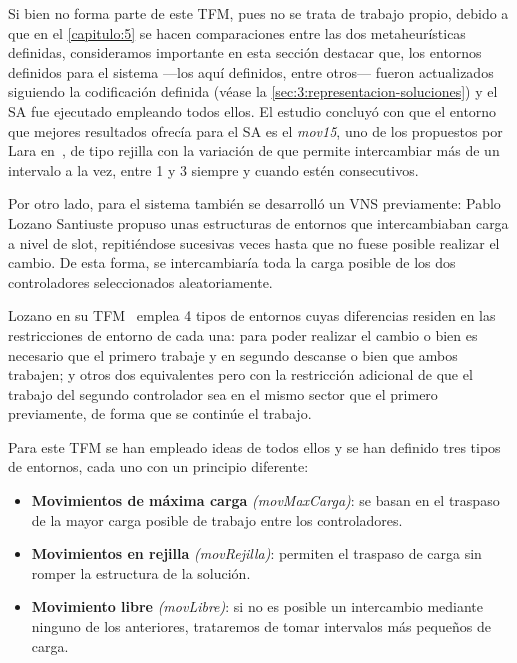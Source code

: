 Si bien no forma parte de este TFM, pues no se trata de trabajo propio, debido a que en el \autoref{capitulo:5} se hacen comparaciones entre las dos metaheurísticas definidas, consideramos importante en esta sección destacar que, los entornos definidos para el sistema \legacy{} ---los aquí definidos, entre otros--- fueron actualizados siguiendo la codificación definida (véase la \autoref{sec:3:representacion-soluciones})
y el SA fue ejecutado empleando todos ellos. El estudio concluyó con que el entorno que mejores resultados ofrecía para el SA es el \textit{mov15}, uno de los propuestos por Lara en~\cite{tesis-jonatan}, de tipo rejilla con la variación de que permite intercambiar más de un intervalo a la vez, entre 1 y 3 siempre y cuando estén consecutivos.

Por otro lado, para el sistema \legacy{} también se desarrolló un VNS previamente: Pablo Lozano Santiuste propuso unas estructuras de entornos que intercambiaban carga a nivel de slot, repitiéndose sucesivas veces hasta que no fuese posible realizar el cambio. De esta forma, se intercambiaría toda la carga posible de los dos controladores seleccionados aleatoriamente. 

Lozano en su TFM~\cite{tesis-pablo} emplea 4 tipos de entornos cuyas diferencias residen en las restricciones de entorno de cada una: para poder realizar el cambio o bien es necesario que el primero trabaje y en segundo descanse o bien que ambos trabajen; y otros dos equivalentes pero con la restricción adicional de que el trabajo del segundo controlador sea en el mismo sector que el primero previamente, de forma que se continúe el trabajo.

Para este TFM se han empleado ideas de todos ellos y se han definido tres tipos de entornos, cada uno con un principio diferente:

\begin{itemize}
    \item \textbf{Movimientos de máxima carga} \textit{(movMaxCarga)}: se basan en el traspaso de la mayor carga posible de trabajo entre los controladores.

    \item \textbf{Movimientos en rejilla} \textit{(movRejilla)}: permiten el traspaso de carga sin romper la estructura de la solución.

    \item \textbf{Movimiento libre} \textit{(movLibre)}: si no es posible un intercambio mediante ninguno de los anteriores, trataremos de tomar intervalos más pequeños de carga.
\end{itemize}

